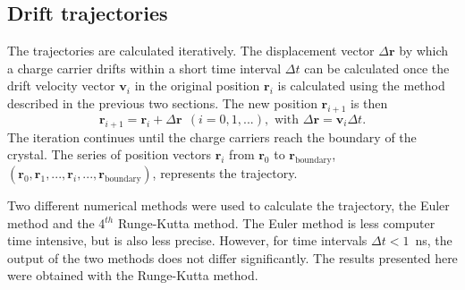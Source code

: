 \documentclass[epj]{svjour}
\begin{document}
\subsection{Drift trajectories} 
\label{s:trj} 
The trajectories are calculated iteratively.  The displacement vector
$\Delta \mathbf{r}$ by which a charge carrier drifts within a short
time interval $\Delta t$ can be calculated once the drift velocity
vector $\mathbf{v}_{i}$ in the original position $\mathbf{r}_{i}$ is
calculated using the method described in the previous two sections.
The new position $\mathbf{r}_{i+1}$ is then
\begin{equation} 
\label{e:pos} 
\mathbf{r}_{i+1} = \mathbf{r}_{i} + \Delta \mathbf{r} \ \ 
(i=0,1,...), \mbox{ with } 
\Delta \mathbf{r} = \mathbf{v}_{i} \Delta t. 
\end{equation} 
The iteration continues until the charge carriers reach the boundary
of the crystal. The series of position vectors $\mathbf{r}_{i}$ from
$\mathbf{r}_{0}$ to $\mathbf{r}_{\mbox{boundary}}$, $(\mathbf{r}_{0},
\mathbf{r}_{1}, ..., \mathbf{r}_{i}, ...,
\mathbf{r}_{\mbox{boundary}})$, represents the trajectory.
 
Two different numerical methods were used to calculate the trajectory,
the Euler method and the 4$^{th}$ Runge-Kutta method.  The Euler
method is less computer time intensive, but is also less precise.
However, for time intervals $\Delta t < 1$~ns, the output of the two
methods does not differ significantly.  The results presented here
were obtained with the Runge-Kutta method.
 
\end{document}
